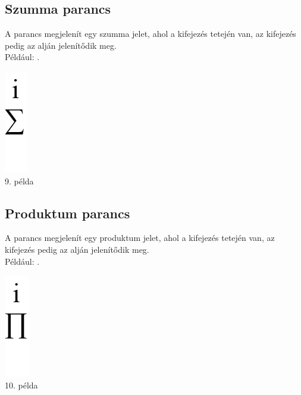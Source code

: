 \documentclass[../spec.tex]{subfiles}
\begin{document}
    \subsection{Szumma parancs}\label{subsec:szumma-parancs}
    A  parancs megjelenít egy szumma jelet, ahol a  kifejezés tetején van, az  kifejezés pedig az alján jelenítődik meg.\\
    Például: .

    \begin{center}
        \includegraphics[scale=0.4]{./images/doc9.png}\\
        9. példa
    \end{center}

    \subsection{Produktum parancs}\label{subsec:prod-parancs}
    A  parancs megjelenít egy produktum jelet, ahol a  kifejezés tetején van, az  kifejezés pedig az alján jelenítődik meg.\\
    Például: .

    \begin{center}
        \includegraphics[scale=0.4]{./images/doc10.png}\\
        10. példa
    \end{center}
\end{document}
